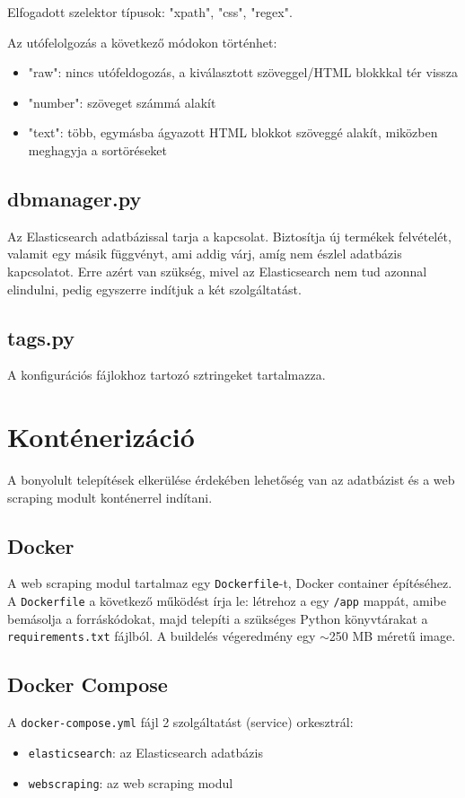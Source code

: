 \documentclass[10pt]{article}
\begin{document}
Elfogadott szelektor típusok: "xpath", "css", "regex".

Az utófelolgozás a következő módokon történhet:
\begin{itemize}
    \item "raw": nincs utófeldogozás, a kiválasztott szöveggel/HTML blokkkal tér vissza
    \item "number": szöveget számmá alakít
    \item "text": több, egymásba ágyazott HTML blokkot szöveggé alakít, miközben meghagyja a sortöréseket 
\end{itemize}
    
\subsection{dbmanager.py}
Az Elasticsearch adatbázissal tarja a kapcsolat. Biztosítja új termékek felvételét, valamit egy másik függvényt, ami addig várj, amíg nem észlel adatbázis kapcsolatot. Erre azért van szükség, mivel az Elasticsearch nem tud azonnal elindulni, pedig egyszerre indítjuk a két szolgáltatást.

\subsection{tags.py}
A konfigurációs fájlokhoz tartozó sztringeket tartalmazza.

\section{Konténerizáció}
A bonyolult telepítések elkerülése érdekében lehetőség van az adatbázist és a web scraping modult konténerrel indítani.

\subsection{Docker}
A web scraping modul tartalmaz egy \lstinline{Dockerfile}-t, Docker container építéséhez. A \lstinline{Dockerfile} a következő működést írja le: létrehoz a egy \lstinline{/app} mappát, amibe bemásolja a forráskódokat, majd telepíti a szükséges Python könyvtárakat a \lstinline{requirements.txt} fájlból. A buildelés végeredmény egy $\sim$250 MB méretű image.

\subsection{Docker Compose}
A \lstinline{docker-compose.yml} fájl 2 szolgáltatást (service) orkesztrál:
\begin{itemize}
    \item \lstinline{elasticsearch}: az Elasticsearch adatbázis
    \item \lstinline{webscraping}: az web scraping modul
\end{itemize}
\end{document}
